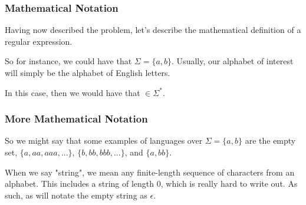 \documentclass[aspectratio=169]{beamer}
\begin{document}
\begin{frame}[fragile]
  \frametitle{Mathematical Notation}

  Having now described the problem, let's describe the mathematical definition
  of a regular expression.


  So for instance, we could have that $\Sigma = \{a, b\}$. Usually, our
  alphabet of interest will simply be the alphabet of English letters.


  In this case, then we would have that  $\in \Sigma^*$.
\end{frame}

\begin{frame}[fragile]
  \frametitle{More Mathematical Notation}


  So we might say that some examples of languages over $\Sigma = \{a, b\}$ are
  the empty set, $\{a, aa, aaa, ...\}$, $\{b, bb, bbb, ...\}$, 
  and $\{a, bb\}$. 

  When we say "string", we mean any finite-length sequence of characters from
  an alphabet. This includes a string of length 0, which is really hard to
  write out. As such, as will notate the empty string as $\epsilon$.
\end{frame}
\end{document}

